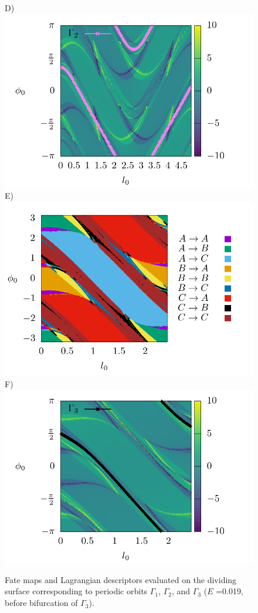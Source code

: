 \documentclass[10pt,aps,onecolumn,superscriptaddress]{revtex4-2}
\begin{document}
\begin{figure}[htbp]
	D)\includegraphics[scale=0.35]{ld_action_ds_gamma2_E_0019.png}
	E)\includegraphics[scale=0.35]{fate_map_ds_gamma3E_0019.png}
	F)\includegraphics[scale=0.35]{ld_action_ds_gamma3_E_0019.png}
	\caption{ Fate maps and Lagrangian descriptors evaluated on the dividing surface corresponding to periodic orbits $\Gamma_1$, $\Gamma_2$, and $\Gamma_3$ ($E$ =0.019, before bifurcation of $\Gamma_3$). }
	\label{fig:ld_fm_ds}
\end{figure}
\end{document}
